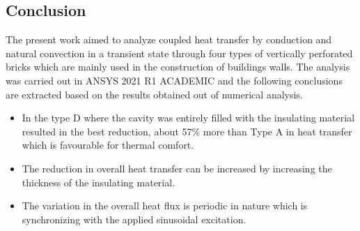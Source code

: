 \documentclass{article}
\begin{document}
\begin{multicols}{2}
\section{Conclusion}
The present work aimed to analyze coupled heat transfer by conduction and  natural convection in a transient state through four types of vertically perforated bricks which are mainly used in the construction of buildings walls. The analysis was carried out in ANSYS 2021 R1 ACADEMIC and the following conclusions are extracted based on the results obtained out of numerical analysis.

\begin{itemize}
\item In the type D where the cavity was entirely filled with the insulating material resulted in the best reduction, about 57\% more than Type A in heat transfer which is favourable for thermal comfort.
\item The reduction in overall heat transfer can be increased by increasing the thickness of the insulating material.
\item The variation in the overall heat flux is periodic in nature which is synchronizing with the applied sinusoidal excitation.

\end{itemize}





\end{multicols}


\nocite{*}
\printbibliography
\end{document}
